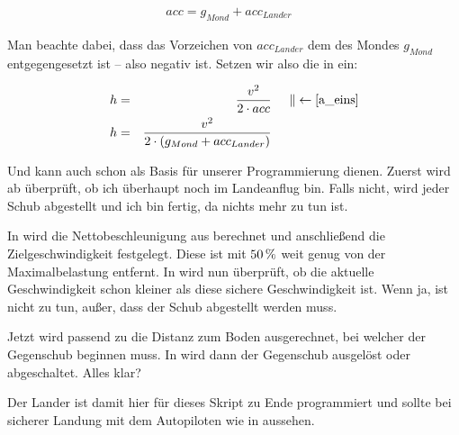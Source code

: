 \begin{align}
	acc = g_{Mond} + acc_{Lander}&\label{a_eins}
\end{align}

Man beachte dabei, dass das Vorzeichen von $acc_{Lander}$ dem des Mondes $g_{Mond}$ entgegengesetzt ist -- also negativ ist. Setzen wir also die  in  ein:

\begin{align}
	h &=& \frac{v^2}{2 \cdot acc}&\hspace{0.5cm}\| \leftarrow \ref{a_eins}\nonumber \\
	h &=&\frac{v^2}{2 \cdot (g_{Mond} + acc_{Lander})} \label{h_zwei}
\end{align}

Und  kann auch schon als Basis für unserer Programmierung dienen. Zuerst wird ab  überprüft, ob ich überhaupt noch im Landeanflug bin. Falls nicht, wird jeder Schub abgestellt und ich bin fertig, da nichts mehr zu tun ist.

In  wird die Nettobeschleunigung aus  berechnet und anschließend die Zielgeschwindigkeit festgelegt. Diese ist mit $\unit[50]{\%}$ weit genug  von der Maximalbelastung entfernt. In  wird nun überprüft, ob die aktuelle Geschwindigkeit schon kleiner als diese sichere Geschwindigkeit ist. Wenn ja, ist nicht zu tun, außer, dass der Schub abgestellt werden muss.

Jetzt wird passend zu  die Distanz zum Boden ausgerechnet, bei welcher der Gegenschub beginnen muss. In  wird dann der Gegenschub ausgelöst oder abgeschaltet. Alles klar?

Der Lander ist damit hier für dieses Skript zu Ende programmiert und sollte bei sicherer Landung mit dem Autopiloten wie in  aussehen.

\newpage
{} 




